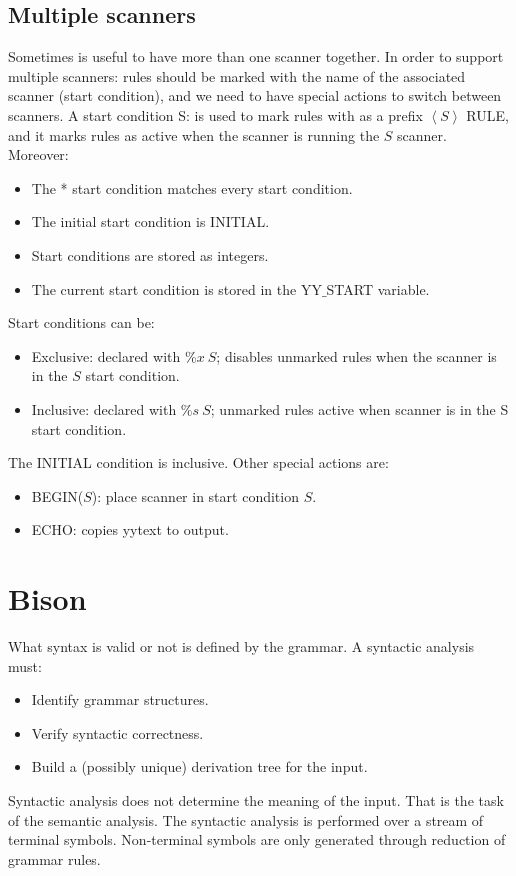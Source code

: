 \documentclass[12pt, a4paper]{report}
\newtheorem[style=M, bodystyle=\normalfont]{operation}{Operation}
\newtheorem[style=M, bodystyle=\normalfont]{theorem}{Theorem}
\newtheorem[style=M, bodystyle=\normalfont]{corollary}{Corollary}
\newtheorem[style=M, bodystyle=\normalfont]{lemma}{Lemma}
\newtheorem[style=M, bodystyle=\normalfont]{definition}{Definition}
\begin{document}
    \subsection{Multiple scanners}
    Sometimes is useful to have more than one scanner together. In order to support multiple scanners: rules should be marked with the name of the associated scanner (start 
    condition), and we need to have special actions to switch between scanners. A start condition S: is used to mark rules with as a prefix 
    $\left\langle S \right\rangle$ RULE, and it marks rules as active when the scanner is running the $S$ scanner. Moreover:
    \begin{itemize}
        \item The * start condition matches every start condition. 
        \item The initial start condition is INITIAL. 
        \item Start conditions are stored as integers.
        \item The current start condition is stored in the YY$\_$START variable.
    \end{itemize}
    Start conditions can be: 
    \begin{itemize}
        \item Exclusive: declared with $\%x \: S$; disables unmarked rules when the scanner is in the $S$ start condition. 
        \item Inclusive: declared with $\%s \: S$; unmarked rules active when scanner is in the S start condition. 
    \end{itemize}
    The INITIAL condition is inclusive. Other special actions are: 
    \begin{itemize}
        \item BEGIN($S$): place scanner in start condition $S$. 
        \item ECHO: copies yytext to output.
    \end{itemize}

    \section{Bison}
        What syntax is valid or not is defined by the grammar. A syntactic analysis must:
        \begin{itemize}
            \item Identify grammar structures.
            \item Verify syntactic correctness.
            \item Build a (possibly unique) derivation tree for the input.
        \end{itemize}
        Syntactic analysis does not determine the meaning of the input. That is the task of the semantic analysis. The syntactic analysis is performed over a stream of
        terminal symbols. Non-terminal symbols are only generated through reduction of grammar rules. 
\end{document}
